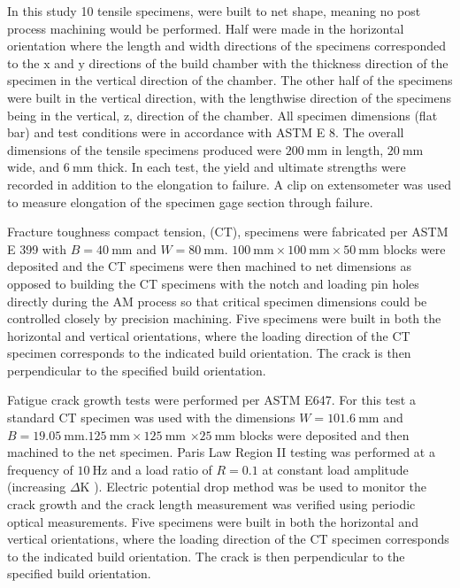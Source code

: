 \documentclass[10pt]{article}
\begin{document}
In this study 10 tensile specimens, were built to net shape, meaning no post process machining would be performed. Half were made in the horizontal orientation where the length and width directions of the specimens corresponded to the $\mathrm{x}$ and $\mathrm{y}$ directions of the build chamber with the thickness direction of the specimen in the vertical direction of the chamber. The other half of the specimens were built in the vertical direction, with the lengthwise direction of the specimens being in the vertical, $\mathrm{z}$, direction of the chamber. All specimen dimensions (flat bar) and test conditions were in accordance with ASTM E 8. The overall dimensions of the tensile specimens produced were $200 \mathrm{~mm}$ in length, $20 \mathrm{~mm}$ wide, and $6 \mathrm{~mm}$ thick. In each test, the yield and ultimate strengths were recorded in addition to the elongation to failure. A clip on extensometer was used to measure elongation of the specimen gage section through failure.

Fracture toughness compact tension, (CT), specimens were fabricated per ASTM E 399 with $B=40 \mathrm{~mm}$ and $W=80 \mathrm{~mm}$. $100 \mathrm{~mm} \times 100 \mathrm{~mm} \times 50 \mathrm{~mm}$ blocks were deposited and the CT specimens were then machined to net dimensions as opposed to building the CT specimens with the notch and loading pin holes directly during the AM process so that critical specimen dimensions could be controlled closely by precision machining. Five specimens were built in both the horizontal and vertical orientations, where the loading direction of the CT specimen corresponds to the indicated build orientation. The crack is then perpendicular to the specified build orientation.

Fatigue crack growth tests were performed per ASTM E647. For this test a standard CT specimen was used with the dimensions $W=101.6 \mathrm{~mm}$ and $B=19.05 \mathrm{~mm} .125 \mathrm{~mm} \times 125 \mathrm{~mm}$ $\times 25 \mathrm{~mm}$ blocks were deposited and then machined to the net specimen. Paris Law Region II testing was performed at a frequency of $10 \mathrm{~Hz}$ and a load ratio of $R=0.1$ at constant load amplitude (increasing $\Delta \mathrm{K}$ ). Electric potential drop method was be used to monitor the crack growth and the crack length measurement was verified using periodic optical measurements. Five specimens were built in both the horizontal and vertical orientations, where the loading direction of the CT specimen corresponds to the indicated build orientation. The crack is then perpendicular to the specified build orientation.
\end{document}
